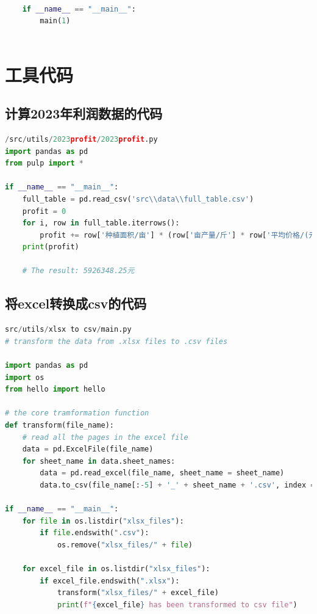 \documentclass{cumcmthesis}
\begin{document}
\begin{appendices}
\begin{lstlisting}[language=python]
    
    if __name__ == "__main__":
        main(1)
    
\end{lstlisting}

\section{工具代码}
\subsection{计算2023年利润数据的代码}
\begin{lstlisting}[language=python]
/src/utils/2023profit/2023profit.py
import pandas as pd
from pulp import *

if __name__ == "__main__":
    full_table = pd.read_csv('src\\data\\full_table.csv')
    profit = 0
    for i, row in full_table.iterrows():
        profit += row['种植面积/亩'] * (row['亩产量/斤'] * row['平均价格/(元/斤)'] - row['种植成本/(元/亩)'])
    print(profit)

    # The result: 5926348.25元
\end{lstlisting}

\subsection{将excel转换成csv的代码}
\begin{lstlisting}[language=python]
src/utils/xlsx to csv/main.py
# transform the data from .xlsx files to .csv files

import pandas as pd
import os
from hello import hello

# the core tramformation function
def transform(file_name):
    # read all the pages in the excel file
    data = pd.ExcelFile(file_name)
    for sheet_name in data.sheet_names:
        data = pd.read_excel(file_name, sheet_name = sheet_name)
        data.to_csv(file_name[:-5] + '_' + sheet_name + '.csv', index = False, encoding='utf-8')

if __name__ == "__main__":
    for file in os.listdir("xlsx_files"):
        if file.endswith(".csv"):
            os.remove("xlsx_files/" + file)

    for excel_file in os.listdir("xlsx_files"):
        if excel_file.endswith(".xlsx"):
            transform("xlsx_files/" + excel_file)
            print(f"{excel_file} has been transformed to csv file")
    

\end{lstlisting}


\end{appendices}
\end{document}
